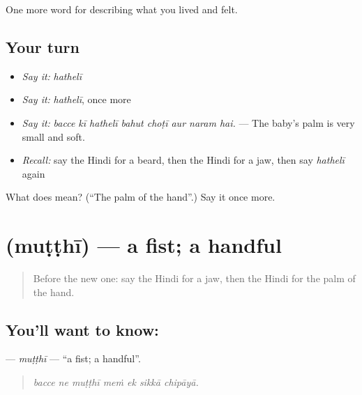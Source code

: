 \begin{grammarlens}[title={What you've built}]
One more word for describing what you lived and felt.
\end{grammarlens}

\subsection*{Your turn}
\begin{itemize}
\raggedright
  \item \emph{Say it:} \emph{hathelī}
  \item \emph{Say it:} \emph{hathelī}, once more
  \item \emph{Say it:} \emph{bacce kī hathelī bahut choṭī aur naram hai.} — The baby's palm is very small and soft.
  \item \emph{Recall:} say the Hindi for a beard, then the Hindi for a jaw, then say \emph{hathelī} again
\end{itemize}

\begin{tcolorbox}[breakable,colback=teal!4,colframe=teal!35!black,title={Before you move on}]
What does  mean? (\textquotedblleft{}The palm of the hand\textquotedblright{}.) Say it once more.
\end{tcolorbox}
\section[\texorpdfstring{\hi{मुट्ठी} (muṭṭhī)}{मुट्ठी (muṭṭhī)}]{ (muṭṭhī) — a fist; a handful}

\label{lesson:HI-C477-mutthi}



\begin{quote}
Before the new one: say the Hindi for a jaw, then the Hindi for the palm of the hand.
\end{quote}

\subsection*{You'll want to know: }
\textbf{} — \emph{muṭṭhī} — \textquotedblleft{}a fist; a handful\textquotedblright{}.

\begin{quote}
      
\end{quote}

\begin{quote}
\emph{bacce ne muṭṭhī meṁ ek sikkā chipāyā.}
\end{quote}

